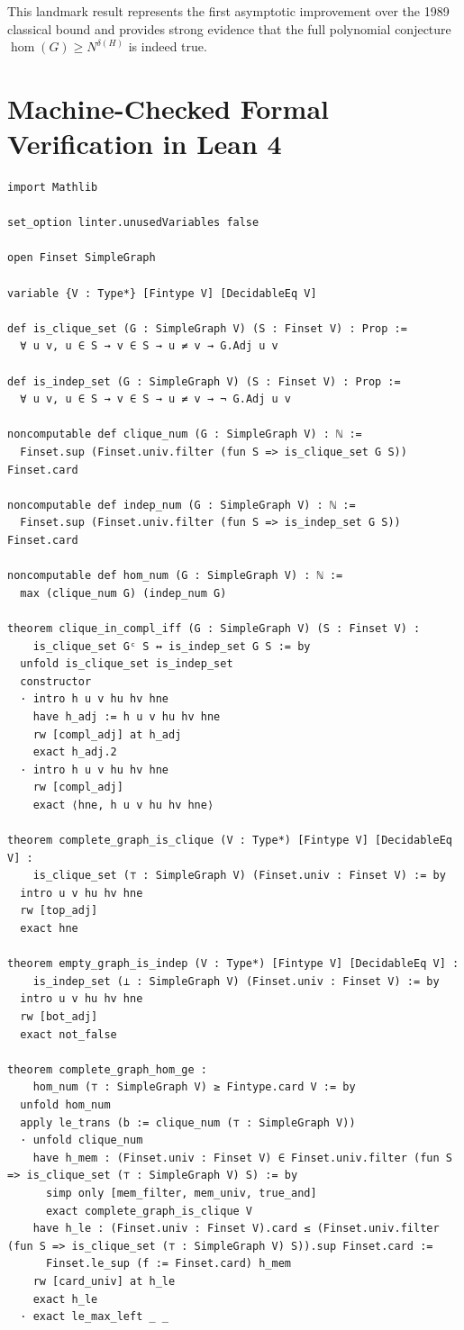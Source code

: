 \documentclass[11pt,a4paper]{article}
\theoremstyle{definition}
\begin{document}
This landmark result represents the first asymptotic improvement over the 1989 classical bound and provides strong evidence that the full polynomial conjecture $\operatorname{hom}(G) \ge N^{\delta(H)}$ is indeed true.

\section{Machine-Checked Formal Verification in Lean 4}

\begin{lstlisting}[caption={Formal Lean 4 Implementation of Graph Homogeneity and Complement Duality}]
import Mathlib

set_option linter.unusedVariables false

open Finset SimpleGraph

variable {V : Type*} [Fintype V] [DecidableEq V]

def is_clique_set (G : SimpleGraph V) (S : Finset V) : Prop :=
  ∀ u v, u ∈ S → v ∈ S → u ≠ v → G.Adj u v

def is_indep_set (G : SimpleGraph V) (S : Finset V) : Prop :=
  ∀ u v, u ∈ S → v ∈ S → u ≠ v → ¬ G.Adj u v

noncomputable def clique_num (G : SimpleGraph V) : ℕ :=
  Finset.sup (Finset.univ.filter (fun S => is_clique_set G S)) Finset.card

noncomputable def indep_num (G : SimpleGraph V) : ℕ :=
  Finset.sup (Finset.univ.filter (fun S => is_indep_set G S)) Finset.card

noncomputable def hom_num (G : SimpleGraph V) : ℕ :=
  max (clique_num G) (indep_num G)

theorem clique_in_compl_iff (G : SimpleGraph V) (S : Finset V) :
    is_clique_set Gᶜ S ↔ is_indep_set G S := by
  unfold is_clique_set is_indep_set
  constructor
  · intro h u v hu hv hne
    have h_adj := h u v hu hv hne
    rw [compl_adj] at h_adj
    exact h_adj.2
  · intro h u v hu hv hne
    rw [compl_adj]
    exact ⟨hne, h u v hu hv hne⟩

theorem complete_graph_is_clique (V : Type*) [Fintype V] [DecidableEq V] :
    is_clique_set (⊤ : SimpleGraph V) (Finset.univ : Finset V) := by
  intro u v hu hv hne
  rw [top_adj]
  exact hne

theorem empty_graph_is_indep (V : Type*) [Fintype V] [DecidableEq V] :
    is_indep_set (⊥ : SimpleGraph V) (Finset.univ : Finset V) := by
  intro u v hu hv hne
  rw [bot_adj]
  exact not_false

theorem complete_graph_hom_ge :
    hom_num (⊤ : SimpleGraph V) ≥ Fintype.card V := by
  unfold hom_num
  apply le_trans (b := clique_num (⊤ : SimpleGraph V))
  · unfold clique_num
    have h_mem : (Finset.univ : Finset V) ∈ Finset.univ.filter (fun S => is_clique_set (⊤ : SimpleGraph V) S) := by
      simp only [mem_filter, mem_univ, true_and]
      exact complete_graph_is_clique V
    have h_le : (Finset.univ : Finset V).card ≤ (Finset.univ.filter (fun S => is_clique_set (⊤ : SimpleGraph V) S)).sup Finset.card :=
      Finset.le_sup (f := Finset.card) h_mem
    rw [card_univ] at h_le
    exact h_le
  · exact le_max_left _ _
\end{lstlisting}
\end{document}
